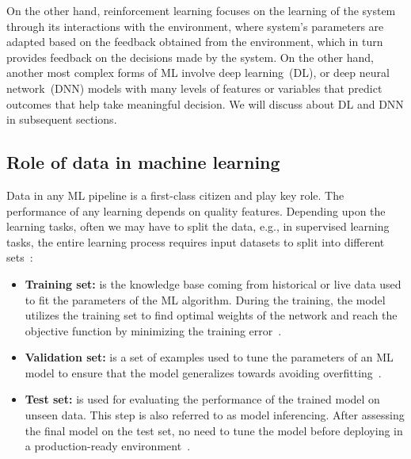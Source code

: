 \hspace*{3.5mm} On the other hand, reinforcement learning focuses on the learning of the system through its interactions with the environment, where system's parameters are adapted based on the feedback obtained from the environment, which in turn provides feedback on the decisions made by the system. On the other hand, another most complex forms of ML involve deep learning~(DL), or deep neural network~(DNN) models with many levels of features or variables that predict outcomes that help take meaningful decision. We will discuss about DL and DNN in subsequent sections. 



\iffalse
\subsection{Role of data in machine learning}
Data in any ML pipeline is a first-class citizen and play key role. The performance of any learning depends on quality features. Depending upon the learning tasks, often we may have to split the data, e.g., in supervised learning tasks, the entire learning process requires input datasets to split into different sets~\cite{karim2018java}:

\vspace{-1mm}
\begin{itemize}[noitemsep]
    \item \textbf{Training set:} is the knowledge base coming from historical or live data used to fit the parameters of the ML algorithm. During the training, the model utilizes the training set to find optimal weights of the network and reach the objective function by minimizing the training error~\cite{karim2018java}. 
    \item \textbf{Validation set:} is a set of examples used to tune the parameters of an ML model to ensure that the model generalizes towards avoiding overfitting~\cite{karim2018java}. 
    \item \textbf{Test set:} is used for evaluating the performance of the trained model on unseen data. This step is also referred to as model inferencing. After assessing the final model on the test set, no need to tune the model before deploying in a production-ready environment~\cite{karim2018java}.
\end{itemize}
\vspace{-1mm}

